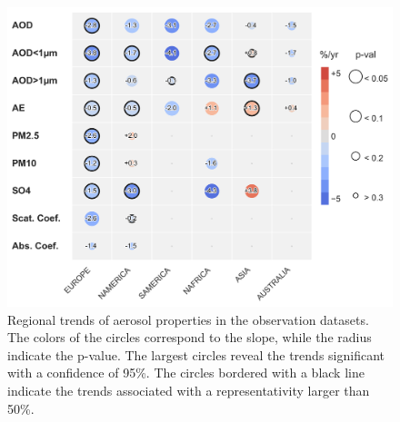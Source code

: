 \documentclass[journal abbreviation, manuscript]{copernicus}
\begin{document}
\begin{figure}[t]
 \includegraphics[width=12cm]{../scripts/figs/heatmaps/OBS.png}
 \caption{Regional trends of aerosol properties in the observation datasets. The colors of the circles correspond to the slope, while the radius indicate the p-value. The largest circles reveal the trends significant with a confidence of 95\%. The circles bordered with a black line indicate the trends associated with a representativity larger than 50\%.}
 \label{fig:obs_trends}
\end{figure}
\end{document}
